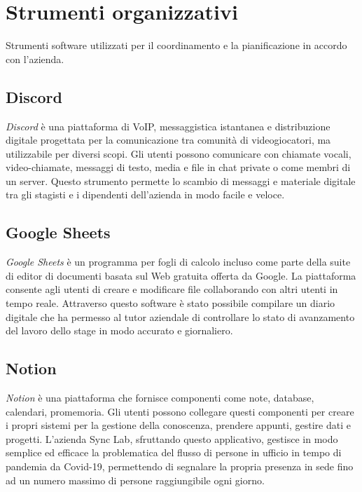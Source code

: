 \section{Strumenti organizzativi}
\label{sez:strumenti-organizzativi}
Strumenti software utilizzati per il coordinamento e la pianificazione in accordo con l'azienda.

\subsection*{Discord}
\textit{Discord} è una piattaforma di VoIP, messaggistica istantanea e distribuzione digitale progettata per la comunicazione tra comunità di videogiocatori, ma utilizzabile per diversi scopi. Gli utenti possono comunicare con chiamate vocali, video-chiamate, messaggi di testo, media e file in chat private o come membri di un server. Questo strumento permette lo scambio di messaggi e materiale digitale tra gli stagisti e i dipendenti dell'azienda in modo facile e veloce.

\subsection*{Google Sheets}
\textit{Google Sheets} è un programma per fogli di calcolo incluso come parte della suite di editor di documenti basata sul Web gratuita offerta da Google. La piattaforma consente agli utenti di creare e modificare file collaborando con altri utenti in tempo reale. Attraverso questo software è stato possibile compilare un diario digitale che ha permesso al tutor aziendale di controllare lo stato di avanzamento del lavoro dello stage in modo accurato e giornaliero.
\subsection*{Notion}
\textit{Notion} è una piattaforma che fornisce componenti come note, database, calendari, promemoria. Gli utenti possono collegare questi componenti per creare i propri sistemi per la gestione della conoscenza, prendere appunti, gestire dati e progetti. L'azienda Sync Lab, sfruttando questo applicativo, gestisce in modo semplice ed efficace la problematica del flusso di persone in ufficio in tempo di pandemia da Covid-19, permettendo di segnalare la propria presenza in sede fino ad un numero massimo di persone raggiungibile ogni giorno.

